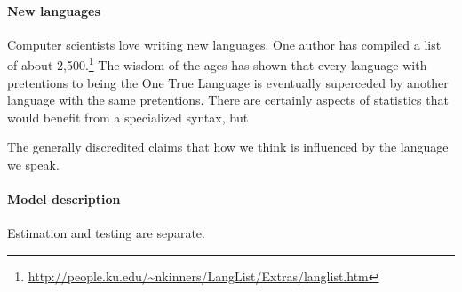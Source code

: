 {\paragraph{New languages} Computer scientists love writing new
languages.  One author has compiled a list of about
2,500.\footnote{\url{http://people.ku.edu/~nkinners/LangList/Extras/langlist.htm}}
The wisdom of the ages has shown that every language with pretentions
to being the One True Language is eventually superceded by another
language with the same pretentions. There are certainly aspects of
statistics that would benefit from a specialized syntax, but 


The
generally discredited  claims that how we
think is influenced by the language we speak. 

\paragraph{Model description} Estimation and testing are separate.

}


